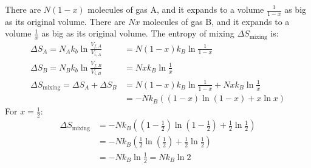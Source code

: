 \documentclass{article}
\begin{document}
\clearpage

There are $N\left(1 - x\right)$ molecules of gas A, and it expands to a volume $\frac{1}{1 - x}$ as big as its original volume. There are $Nx$ molecules of gas B, and it expands to a volume $\frac{1}{x}$ as big as its original volume. The entropy of mixing $\Delta S_{\text{mixing}}$ is:
\begin{equation}
    \begin{split}
        \Delta S_A = N_A k_b\ln\frac{V_{f,A}}{V_{i,A}} & = N\left(1 - x\right)k_B\ln\frac{1}{1 - x} \\
        \Delta S_B = N_B k_b\ln\frac{V_{f,B}}{V_{i,B}} & = Nxk_B\ln\frac{1}{x} \\
        \Delta S_{\text{mixing}} = \Delta S_A + \Delta S_B & = N\left(1 - x\right)k_B\ln\frac{1}{1 - x} + Nxk_B\ln\frac{1}{x} \\
        & = -Nk_B\left(\left(1 - x\right)\ln\left(1 - x\right) + x\ln x\right)
    \end{split}
\end{equation}
For $x = \frac{1}{2}$:
\begin{equation}
    \begin{split}
        \Delta S_{\text{mixing}} & = -Nk_B\left(\left(1 - \frac{1}{2}\right)\ln\left(1 - \frac{1}{2}\right) + \frac{1}{2}\ln \frac{1}{2}\right) \\
        & = -Nk_B\left(\frac{1}{2}\ln\left(\frac{1}{2}\right) + \frac{1}{2}\ln \frac{1}{2}\right) \\
        & = -Nk_B\ln \frac{1}{2} = Nk_B\ln 2 \\
    \end{split}
\end{equation}

\clearpage

\end{document}
